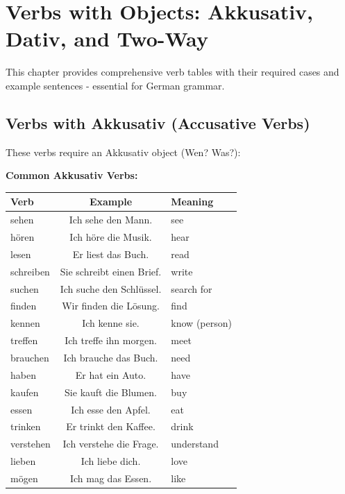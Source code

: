 \chapter{Verbs with Objects: Akkusativ, Dativ, and Two-Way}
\label{cha:VerbenObjekte}

This chapter provides comprehensive verb tables with their required cases and example sentences - essential for German grammar.

\section{Verbs with Akkusativ (Accusative Verbs)}
\label{sec:AkkusativVerben}

These verbs require an Akkusativ object (Wen? Was?):

\bigskip
\noindent\textbf{Common Akkusativ Verbs:}

\begin{center}
\begin{tabular}{|l|c|l|}
\hline
Verb & Example & Meaning \\ \hline
sehen & Ich sehe den Mann. & see \\ \hline
hören & Ich höre die Musik. & hear \\ \hline
lesen & Er liest das Buch. & read \\ \hline
schreiben & Sie schreibt einen Brief. & write \\ \hline
suchen & Ich suche den Schlüssel. & search for \\ \hline
finden & Wir finden die Lösung. & find \\ \hline
kennen & Ich kenne sie. & know (person) \\ \hline
treffen & Ich treffe ihn morgen. & meet \\ \hline
brauchen & Ich brauche das Buch. & need \\ \hline
haben & Er hat ein Auto. & have \\ \hline
kaufen & Sie kauft die Blumen. & buy \\ \hline
essen & Ich esse den Apfel. & eat \\ \hline
trinken & Er trinkt den Kaffee. & drink \\ \hline
verstehen & Ich verstehe die Frage. & understand \\ \hline
lieben & Ich liebe dich. & love \\ \hline
mögen & Ich mag das Essen. & like \\ \hline
\end{tabular}
\end{center}


